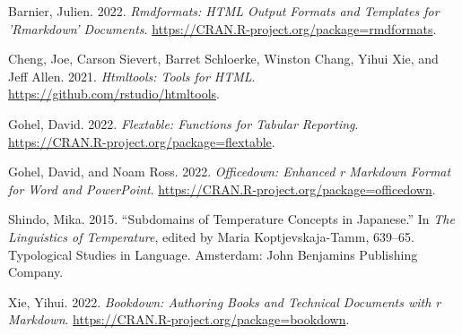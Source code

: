 \documentclass[
  letterpaper,
  DIV=11,
  numbers=noendperiod]{scrartcl}
\newlength{\cslhangindent}
\newlength{\cslentryspacingunit} %
\newenvironment{CSLReferences}[2] %
 {%
  \setlength{\parindent}{0pt}
  \ifodd #1
  \let\oldpar\par
  \def\par{\hangindent=\cslhangindent\oldpar}
  \fi
  \setlength{\parskip}{#2\cslentryspacingunit}
 }%
 {}
\begin{document}
\hypertarget{refs}{}
\begin{CSLReferences}{1}{0}
\leavevmode{}%
Barnier, Julien. 2022. \emph{Rmdformats: HTML Output Formats and
Templates for 'Rmarkdown' Documents}.
\url{https://CRAN.R-project.org/package=rmdformats}.

\leavevmode{}%
Cheng, Joe, Carson Sievert, Barret Schloerke, Winston Chang, Yihui Xie,
and Jeff Allen. 2021. \emph{Htmltools: Tools for HTML}.
\url{https://github.com/rstudio/htmltools}.

\leavevmode{}%
Gohel, David. 2022. \emph{Flextable: Functions for Tabular Reporting}.
\url{https://CRAN.R-project.org/package=flextable}.

\leavevmode{}%
Gohel, David, and Noam Ross. 2022. \emph{Officedown: Enhanced r Markdown
Format for Word and PowerPoint}.
\url{https://CRAN.R-project.org/package=officedown}.

\leavevmode{}%
Shindo, Mika. 2015. {``Subdomains of Temperature Concepts in
{Japanese}.''} In \emph{The {Linguistics} of {Temperature}}, edited by
Maria Koptjevskaja-Tamm, 639--65. Typological {Studies} in {Language}.
{Amsterdam}: {John Benjamins Publishing Company}.

\leavevmode{}%
Xie, Yihui. 2022. \emph{Bookdown: Authoring Books and Technical
Documents with r Markdown}.
\url{https://CRAN.R-project.org/package=bookdown}.

\end{CSLReferences}
\end{document}
